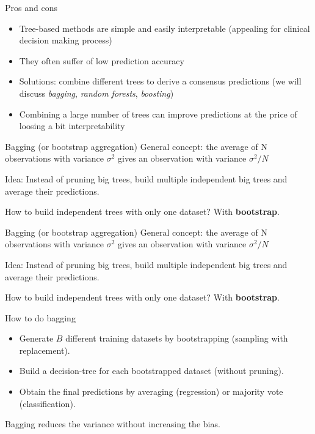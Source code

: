 \documentclass[notes]{beamer}          %
\begin{document}
\begin{frame}{Pros and cons}
\begin{itemize}
 \item Tree-based methods are simple and easily interpretable (appealing for clinical decision making process)
 \item They often suffer of low prediction accuracy
 \item Solutions: combine different trees to derive a consensus predictions (we will discuss  \textit{bagging}, \textit{random forests}, \textit{boosting})
 \item Combining a large number of trees can improve predictions at the price of loosing a bit interpretability
\end{itemize}
\end{frame}


\begin{frame}{Bagging (or bootstrap aggregation)}
General concept: the average of N observations with variance $\sigma^2$ gives an observation with variance $\sigma^2/N$

\vspace{1cm}

Idea: Instead of pruning big trees, build multiple independent big trees and average their predictions.

\vspace{1cm}

How to build independent trees with only one dataset? With \textbf{bootstrap}.
\end{frame}

\begin{frame}{Bagging (or bootstrap aggregation)}
General concept: the average of N observations with variance $\sigma^2$ gives an observation with variance $\sigma^2/N$

\vspace{1cm}

Idea: Instead of pruning big trees, build multiple independent big trees and average their predictions.

\vspace{1cm}

How to build independent trees with only one dataset? With \textbf{bootstrap}.
\end{frame}

\begin{frame}{How to do bagging}

\begin{itemize}
\item Generate $B$ different training datasets by bootstrapping (sampling with replacement).
\item Build a decision-tree for each bootstrapped dataset (without pruning).
\item Obtain the final predictions by averaging (regression) or majority vote (classification).
\end{itemize}

Bagging reduces the variance without increasing the bias.
\end{frame}
\end{document}

